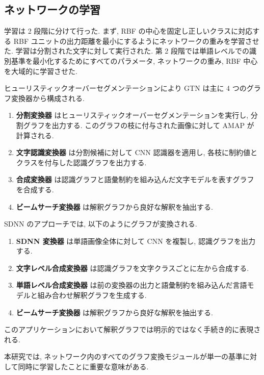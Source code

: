 \documentclass[twocolumn]{jarticle}     %
\begin{document}
\subsection*{ネットワークの学習}
学習は 2 段階に分けて行った. まず, RBF の中心を固定し正しいクラスに対応する RBF ユニットの出力距離を最小にするようにネットワークの重みを学習させた. 学習は分割された文字に対して実行された. 
第 2 段階では単語レベルでの識別基準を最小化するためにすべてのパラメータ, ネットワークの重み, RBF 中心を大域的に学習させた. 
\par
ヒューリスティックオーバーセグメンテーションにより GTN は主に 4 つのグラフ変換器から構成される.
\begin{enumerate}
  \item \textbf{分割変換器} はヒューリスティックオーバーセグメンテーションを実行し, 分割グラフを出力する. このグラフの枝に付与された画像に対して AMAP が計算される. 
  \item \textbf{文字認識変換器} は分割候補に対して CNN 認識器を適用し, 各枝に制約値とクラスを付与した認識グラフを出力する. 
  \item \textbf{合成変換器} は認識グラフと語彙制約を組み込んだ文字モデルを表すグラフを合成する.
  \item \textbf{ビームサーチ変換器} は解釈グラフから良好な解釈を抽出する.
\end{enumerate}
SDNN のアプローチでは, 以下のようにグラフが変換される.
\begin{enumerate}
  \item \textbf{SDNN 変換器} は単語画像全体に対して CNN を複製し, 認識グラフを出力する. 
  \item \textbf{文字レベル合成変換器} は認識グラフを文字クラスごとに左から合成する. 
  \item \textbf{単語レベル合成変換器} は前の変換器の出力と語彙制約を組み込んだ言語モデルと組み合わせ解釈グラフを生成する.
  \item \textbf{ビームサーチ変換器} は解釈グラフから良好な解釈を抽出する.
\end{enumerate}
このアプリケーションにおいて解釈グラフでは明示的ではなく手続き的に表現される. 
\par
本研究では, ネットワーク内のすべてのグラフ変換モジュールが単一の基準に対して同時に学習したことに重要な意味がある.
\end{document}
